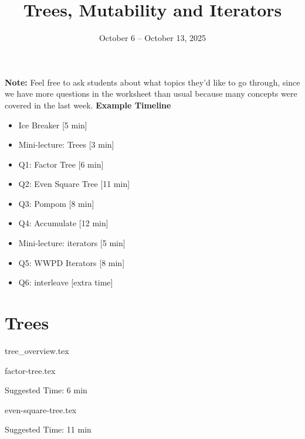 \documentclass{exam}
\title{Trees, Mutability and Iterators}
\date{October 6 -- October 13, 2025}
\begin{document}
\maketitle

\begin{meta}
    \textbf{Note:} Feel free to ask students about what topics they'd like to go through, since we have more questions in the worksheet than usual because many concepts were covered in the last week. 
    \textbf{Example Timeline}
    \begin{itemize}
        \item Ice Breaker [5 min]
        \item Mini-lecture: Trees [3 min]
        \item Q1: Factor Tree [6 min]
        \item Q2: Even Square Tree [11 min]
        \item Q3: Pompom [8 min]
        \item Q4: Accumulate [12 min]
        \item Mini-lecture: iterators [5 min]
        \item Q5: WWPD Iterators [8 min]
        \item Q6: interleave [extra time]
    \end{itemize}

\end{meta}

\section{Trees}
{tree_overview.tex}
\pagebreak

\begin{questions}

    {factor-tree.tex}
    \begin{questionmeta}
        Suggested Time: 6 min
    \end{questionmeta}

    {even-square-tree.tex}
    \begin{questionmeta}
        Suggested Time: 11 min
    \end{questionmeta}


\end{questions}
\end{document}
